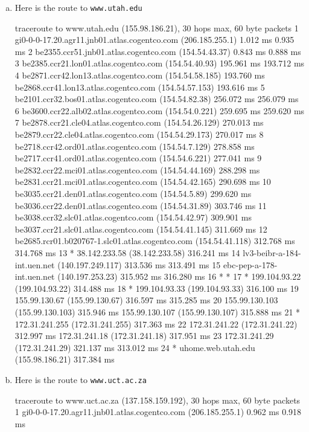 \documentclass{article}
\begin{document}
\begin{enumerate}[a.]
\item Here is the route to {\tt www.utah.edu}
\begin{code}
traceroute to www.utah.edu (155.98.186.21), 30 hops max, 60 byte packets
 1  gi0-0-0-17.20.agr11.jnb01.atlas.cogentco.com (206.185.255.1)  1.012 ms  0.935 ms
 2  be2355.ccr51.jnb01.atlas.cogentco.com (154.54.43.37)  0.843 ms  0.888 ms
 3  be2385.ccr21.lon01.atlas.cogentco.com (154.54.40.93)  195.961 ms  193.712 ms
 4  be2871.ccr42.lon13.atlas.cogentco.com (154.54.58.185)  193.760 ms be2868.ccr41.lon13.atlas.cogentco.com (154.54.57.153)  193.616 ms
 5  be2101.ccr32.bos01.atlas.cogentco.com (154.54.82.38)  256.072 ms  256.079 ms
 6  be3600.ccr22.alb02.atlas.cogentco.com (154.54.0.221)  259.695 ms  259.620 ms
 7  be2878.ccr21.cle04.atlas.cogentco.com (154.54.26.129)  270.013 ms be2879.ccr22.cle04.atlas.cogentco.com (154.54.29.173)  270.017 ms
 8  be2718.ccr42.ord01.atlas.cogentco.com (154.54.7.129)  278.858 ms be2717.ccr41.ord01.atlas.cogentco.com (154.54.6.221)  277.041 ms
 9  be2832.ccr22.mci01.atlas.cogentco.com (154.54.44.169)  288.298 ms be2831.ccr21.mci01.atlas.cogentco.com (154.54.42.165)  290.698 ms
10  be3035.ccr21.den01.atlas.cogentco.com (154.54.5.89)  299.620 ms be3036.ccr22.den01.atlas.cogentco.com (154.54.31.89)  303.746 ms
11  be3038.ccr32.slc01.atlas.cogentco.com (154.54.42.97)  309.901 ms be3037.ccr21.slc01.atlas.cogentco.com (154.54.41.145)  311.669 ms
12  be2685.rcr01.b020767-1.slc01.atlas.cogentco.com (154.54.41.118)  312.768 ms  314.768 ms
13  * 38.142.233.58 (38.142.233.58)  316.241 ms
14  lv3-beibr-a-184-int.uen.net (140.197.249.117)  313.536 ms  313.491 ms
15  ebc-pep-a-178-int.uen.net (140.197.253.23)  315.952 ms  316.280 ms
16  * *
17  * 199.104.93.22 (199.104.93.22)  314.488 ms
18  * 199.104.93.33 (199.104.93.33)  316.100 ms
19  155.99.130.67 (155.99.130.67)  316.597 ms  315.285 ms
20  155.99.130.103 (155.99.130.103)  315.946 ms 155.99.130.107 (155.99.130.107)  315.888 ms
21  * 172.31.241.255 (172.31.241.255)  317.363 ms
22  172.31.241.22 (172.31.241.22)  312.997 ms 172.31.241.18 (172.31.241.18)  317.951 ms
23  172.31.241.29 (172.31.241.29)  321.137 ms  313.012 ms
24  * uhome.web.utah.edu (155.98.186.21)  317.384 ms
\end{code}
\item Here is the route to {\tt www.uct.ac.za}
\begin{code}
traceroute to www.uct.ac.za (137.158.159.192), 30 hops max, 60 byte packets
 1  gi0-0-0-17.20.agr11.jnb01.atlas.cogentco.com (206.185.255.1)  0.962 ms  0.918 ms

\end{code}
\end{enumerate}
\end{document}

